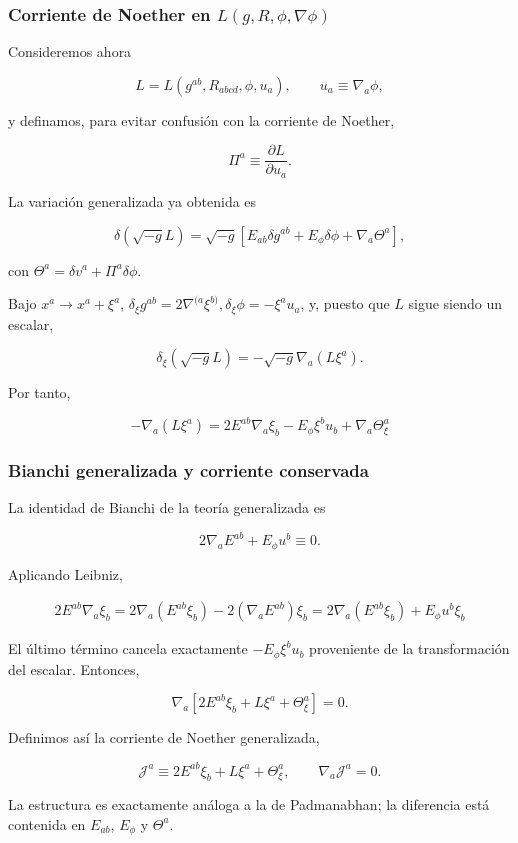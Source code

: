 \documentclass{beamer}
\newcommand{\CompactDisplaySpacing}{%
  \setlength{\abovedisplayskip}{2pt plus 1pt minus 1pt}%
  \setlength{\belowdisplayskip}{2pt plus 1pt minus 1pt}%
  \setlength{\abovedisplayshortskip}{0pt plus 1pt}%
  \setlength{\belowdisplayshortskip}{1pt plus 1pt}%
}
\begin{document}
\begin{frame}[label=nav-frame-082]
	\frametitle{Corriente de Noether en \(L(g,R,\phi,\nabla\phi)\)}
\linespread{.96}\selectfont\CompactDisplaySpacing
	\small
	\CompactDisplaySpacing

	Consideremos ahora

	\[
	L=L(g^{ab},R_{abcd},\phi,u_a),
	\qquad
	u_a\equiv\nabla_a\phi,
	\]

	y definamos, para evitar confusión con la corriente de Noether,

	\[
	\Pi^a
	\equiv
	\frac{\partial L}{\partial u_a}.
	\]

	La variación generalizada ya obtenida es

	\[
	\delta(\sqrt{-g}L)
	=
	\sqrt{-g}
	\left[
	E_{ab}\delta g^{ab}
	+
	E_\phi\delta\phi
	+
	\nabla_a\Theta^a
	\right],
	\]

	con $\Theta^a = \delta v^a+\Pi^a\delta\phi$.

	Bajo \(x^a\rightarrow x^a+\xi^a\), $\delta_\xi g^{ab}
	= 2\nabla^{(a}\xi^{b)}, \delta_\xi\phi = -\xi^a u_a$, y, puesto que \(L\) sigue siendo un escalar,

	\[
	\delta_\xi(\sqrt{-g}L)
	=
	-\sqrt{-g}\nabla_a(L\xi^a).
	\]

	Por tanto,

	\[
	-\nabla_a(L\xi^a)
	=
	2E^{ab}\nabla_a\xi_b
	-
	E_\phi\xi^bu_b
	+
	\nabla_a\Theta_\xi^a
	\]

\end{frame}


\begin{frame}[label=nav-frame-083]
	\frametitle{Bianchi generalizada y corriente conservada}
	\small

	La identidad de Bianchi de la teoría generalizada es

	\[
	\boxed{
		2\nabla_aE^{ab}
		+
		E_\phi u^b
		\equiv0.
	}
	\]

	Aplicando Leibniz,

	\[
	\begin{aligned}
		2E^{ab}\nabla_a\xi_b
		=
		2\nabla_a(E^{ab}\xi_b)
		-
		2(\nabla_aE^{ab})\xi_b
		=
		2\nabla_a(E^{ab}\xi_b)
		+
		E_\phi u^b\xi_b
	\end{aligned}
	\]

	El último término cancela exactamente $-E_\phi\xi^bu_b$	proveniente de la transformación del escalar. Entonces,

	\[
	\nabla_a
	\left[
	2E^{ab}\xi_b
	+
	L\xi^a
	+
	\Theta_\xi^a
	\right]
	=0.
	\]

	Definimos así la corriente de Noether generalizada,

	\begin{equation}
		\boxed{
			\mathcal J^a
			\equiv
			2E^{ab}\xi_b
			+
			L\xi^a
			+
			\Theta_\xi^a,
			\qquad
			\nabla_a\mathcal J^a=0.
		}
		\label{eq:noether-current-generalizada}
	\end{equation}

	La estructura es exactamente análoga a la de Padmanabhan;
	la diferencia está contenida en \(E_{ab}\), \(E_\phi\) y
	\(\Theta^a\).

\end{frame}
\end{document}
